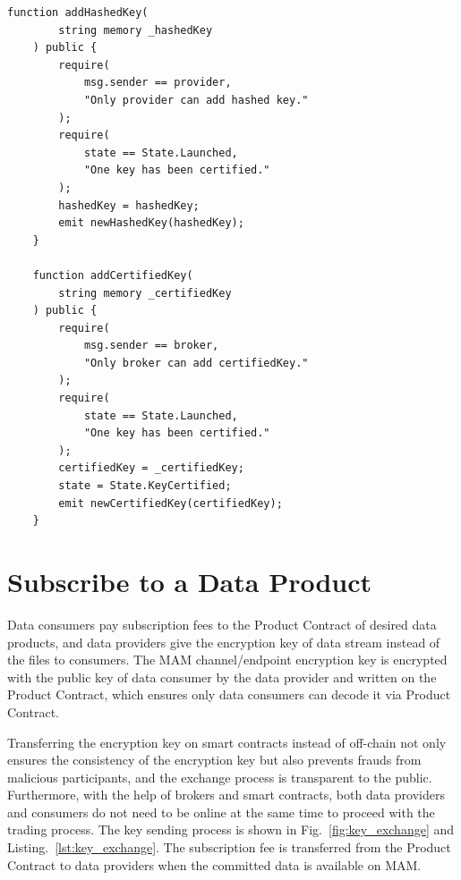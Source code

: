 \begin{spacing}{2.0}
\lstset{style=solidity}
\begin{lstlisting}[caption={Functions of hased key update and certified key update}, label={lst:key_certification}, frame=single]
    function addHashedKey(
        string memory _hashedKey
    ) public {
        require(
            msg.sender == provider,
            "Only provider can add hashed key."
        );
        require(
            state == State.Launched,
            "One key has been certified."
        );
        hashedKey = hashedKey;
        emit newHashedKey(hashedKey);
    }

    function addCertifiedKey(
        string memory _certifiedKey
    ) public {
        require(
            msg.sender == broker,
            "Only broker can add certifiedKey."
        );
        require(
            state == State.Launched,
            "One key has been certified."
        );
        certifiedKey = _certifiedKey;
        state = State.KeyCertified;
        emit newCertifiedKey(certifiedKey);
    }
\end{lstlisting}
\clearpage

\section{Subscribe to a Data Product}
Data consumers pay subscription fees to the Product Contract of desired data products, and data providers give the encryption key of data stream instead of the files to consumers. The MAM channel/endpoint encryption key is encrypted with the public key of data consumer by the data provider and written on the Product Contract, which ensures only data consumers can decode it via Product Contract.

Transferring the encryption key on smart contracts instead of off-chain not only ensures the consistency of the encryption key but also prevents frauds from malicious participants, and the exchange process is transparent to the public. Furthermore, with the help of brokers and smart contracts, both data providers and consumers do not need to be online at the same time to proceed with the trading process. The key sending process is shown in Fig.~\ref{fig:key_exchange} and Listing.~\ref{lst:key_exchange}. The subscription fee is transferred from the Product Contract to data providers when the committed data is available on MAM.


\end{spacing}
